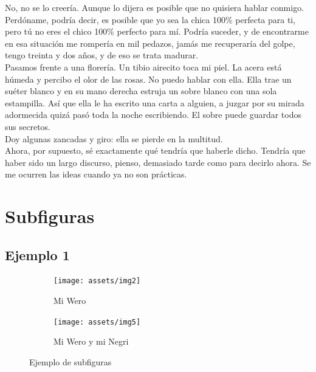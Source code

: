 \documentclass[letterpaper]{article}
\begin{document}
  No, no se lo creería. Aunque lo dijera es posible que no quisiera hablar
  conmigo. Perdóname, podría decir, es posible que yo sea la chica 100\%
  perfecta para ti, pero tú no eres el chico 100\% perfecto para mí. Podría
  suceder, y de encontrarme en esa situación me rompería en mil pedazos, jamás
  me recuperaría del golpe, tengo treinta y dos años, y de eso se trata madurar.
  \\

Pasamos frente a una florería. Un tibio airecito toca mi piel. La acera está
húmeda y percibo el olor de las rosas. No puedo hablar con ella. Ella trae un
suéter blanco y en su mano derecha estruja un sobre blanco con una sola
estampilla. Así que ella le ha escrito una carta a alguien, a juzgar por su
mirada adormecida quizá pasó toda la noche escribiendo. El sobre puede guardar
todos sus secretos. \\

Doy algunas zancadas y giro: ella se pierde en la multitud. \\

Ahora, por supuesto, sé exactamente qué tendría que haberle dicho. Tendría que
haber sido un largo discurso, pienso, demasiado tarde como para decirlo ahora.
Se me ocurren las ideas cuando ya no son prácticas. \\


	\section{Subfiguras}
	\subsection{Ejemplo 1}
	
	\begin{figure}[h]
		\centering
		\begin{subfigure}{6cm}
			\texttt{[image: assets/img2]}
			\caption{Mi Wero}
		\end{subfigure}
		\begin{subfigure}{6cm}
			\texttt{[image: assets/img5]}
			\caption{Mi Wero y mi Negri}
		\end{subfigure}
		\caption{Ejemplo de subfiguras}
	\end{figure}


	
\end{document}
